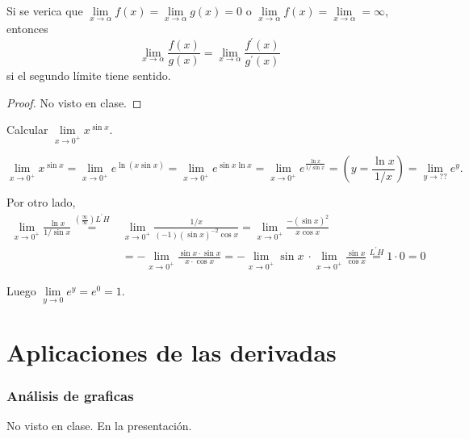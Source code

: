 \begin{theorem}[de L'Hopital]
	Si se verica que \(\lim\limits_{x  \to \alpha} f(x) = \lim\limits_{x  \to \alpha} g(x) = 0 \) o \(\lim\limits_{x  \to \alpha} f(x) = \lim\limits_{x  \to \alpha} = \infty \), entonces
	\[
		\lim\limits_{x  \to \alpha} \frac{f(x )}{g(x)} = \lim\limits_{x  \to \alpha} \frac{f^\prime (x )}{g^\prime (x )}
	\]
	si el segundo límite tiene sentido.
\end{theorem}
\begin{proof}
	No visto en clase.
\end{proof}

\vspace{0.4cm}
\begin{example}
	Calcular \(\lim\limits_{x  \to 0^{+}} x^{\sin x}\).

	\[\lim\limits_{x  \to 0^{+ } } x^{\sin x} = \lim\limits_{x  \to 0^{+ } } e^{\ln (x \sin x)} = \lim\limits_{x  \to 0^{+ } } e^{\sin x \ln x} = \lim\limits_{x  \to 0^{+ } } e^{\frac{\ln x }{1 / \sin x}} = (y = \frac{\ln x }{1 / x }) = \lim\limits_{y  \to ??} e^{y}     .\]

	Por otro lado,
	\begin{align*}
		\lim\limits_{x  \to 0^{+ } } \frac{\ln x }{1 / \sin x}  \overset{(\frac{\infty}{\infty}) L^\prime H}{=} & \lim\limits_{x \to 0^{+} } \frac{ 1 / x }{(-1)(\sin  x)^{-2} \cos  x } = \lim\limits_{x  \to 0^{+} } \frac{-(\sin x)^{2} }{x \cos  x} \\ & =  -\lim\limits_{x  \to 0^{+ } } \frac{\sin x \cdot \sin x}{x \cdot \cos x} = - \lim\limits_{x  \to 0^{+ } } \sin x\ \cdot \lim\limits_{x  \to 0^{+ } } \frac{\sin x}{\cos x} \overset{L^\prime H}{=} 1 \cdot 0 = 0
	\end{align*}

	Luego \(\lim\limits_{y \to 0} e^{y} = e^{0} = 1   \).
\end{example}

\part{Aplicaciones de las derivadas}
\section{Análisis de graficas}
No visto en clase. En la presentación.
